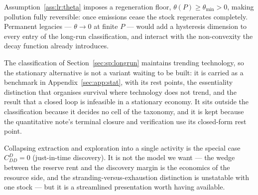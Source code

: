  Assumption~\ref{ass:lr:theta} imposes a regeneration floor,
$\theta\left(P\right)\ge\theta_{\min}>0$, making pollution fully reversible: once emissions cease the
stock regenerates completely. Permanent legacies --- $\theta\to0$ at finite $P$ --- would add a
hysteresis dimension to every entry of the long-run classification, and interact with the
non-convexity the decay function already introduces.

 The classification of Section~\ref{sec:sp:longrun} maintains
trending technology, so the stationary alternative is not a variant waiting to be built: it is
carried as a benchmark in Appendix~\ref{sec:app:stat}, with its rest points, the essentiality
distinction that organises survival where technology does not trend, and the result that a closed
loop is infeasible in a stationary economy. It sits outside the classification because it decides no
cell of the taxonomy, and it is kept because the quantitative note's terminal closure and
verification use its closed-form rest point.

 Collapsing extraction and exploration into a single activity is the
special case $C^D_{DD}=0$ (just-in-time discovery). It is not the model we want --- the wedge between
the reserve rent and the discovery margin is the economics of the resource side, and the
stranding-versus-exhaustion distinction is unstatable with one stock --- but it is a streamlined
presentation worth having available.
